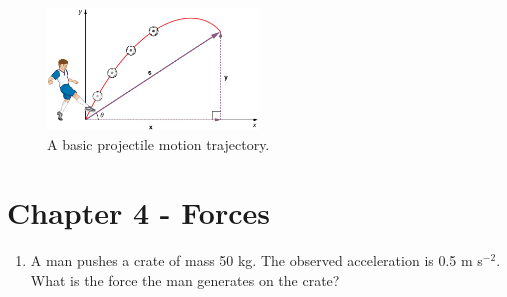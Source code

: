 \documentclass{article}
\begin{document}
\begin{figure}
\centering
\includegraphics[width=0.5\textwidth]{figures/kick.jpeg}
\caption{\label{fig:1} A basic projectile motion trajectory.}
\end{figure}

\section{Chapter 4 - Forces}

\begin{enumerate}
\item A man pushes a crate of mass 50 kg.  The observed acceleration is 0.5 m s$^{-2}$.  What is the force the man generates on the crate?
\end{enumerate}
\end{document}
